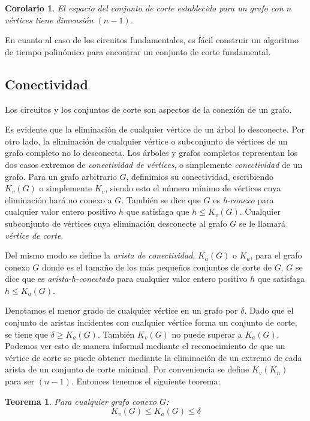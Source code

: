 \documentclass[10pt,a5paper]{book}
\newtheorem{teorema}{Teorema}[chapter]
\newtheorem{cor}[]{Corolario}[chapter]
\begin{document}
\begin{cor}
El espacio del conjunto de corte establecido para un grafo con $n$ vértices tiene dimensión $(n-1)$.
\end{cor}

En cuanto al caso de los circuitos fundamentales, es fácil construir un algoritmo de tiempo polinómico para encontrar un conjunto de corte fundamental.

\subsection{Conectividad}

Los circuitos y los conjuntos de corte son aspectos de la conexión de un grafo.

Es evidente que la eliminación de cualquier vértice de un árbol lo desconecte. Por otro lado, la eliminación de cualquier vértice o subconjunto de vértices de un grafo completo no lo desconecta. Los árboles y grafos completos representan los dos casos extremos de \emph{conectividad de vértices}, o simplemente \emph{conectividad} de un grafo. Para un grafo arbitrario $G$, definimios su conectividad, escribiendo $K_v(G)$ o simplemente $K_v$, siendo esto el número mínimo de vértices cuya eliminación hará no conexo a $G$. También se dice que $G$ es \emph{h-conexo} para cualquier valor entero positivo $h$ que satisfaga que $h \le K_v(G)$. Cualquier subconjunto de vértices cuya eliminación desconecte al grafo $G$ se le llamará \emph{vértice de corte}.

Del mismo modo se define la \emph{arista de conectividad}, $K_a(G)$ o $K_a$, para el grafo conexo $G$ donde es el tamaño de los más pequeños conjuntos de corte de $G$. $G$ se dice que es \emph{arista-h-conectado} para cualquier valor entero positivo $h$ que satisfaga $h \le K_a(G)$.

Denotamos el menor grado de cualquier vértice en un grafo por $\delta$. Dado que el conjunto de aristas incidentes con cualquier vértice forma un conjunto de corte, se tiene que $\delta \ge K_a(G)$. También $K_v(G)$ no puede superar a $K_a(G)$. Podemos ver esto de manera informal mediante el reconocimiento de que un vértice de corte se puede obtener mediante la eliminación de un extremo de cada arista de un conjunto de corte minimal. Por conveniencia se define $K_v(K_n)$ para ser $(n-1)$. Entonces tenemos el siguiente teorema:

\begin{teorema}
Para cualquier grafo conexo $G$:
\[ K_v(G) \le K_a(G) \le \delta \]
\end{teorema}
\end{document}
